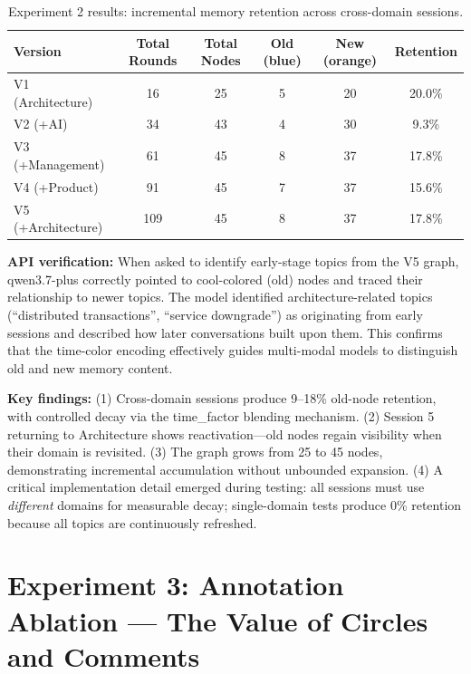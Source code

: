\documentclass[11pt,a4paper]{article}
\begin{document}
\begin{table}[h]
\centering\footnotesize
\caption{Experiment 2 results: incremental memory retention across cross-domain sessions.}
\label{tab:exp2_res}
\begin{tabular}{lccccc}
\toprule
\textbf{Version} & \textbf{Total Rounds} & \textbf{Total Nodes} & \textbf{Old (blue)} & \textbf{New (orange)} & \textbf{Retention} \\
\midrule
V1 (Architecture)     & 16  & 25 & 5  & 20 & 20.0\% \\
V2 (+AI)              & 34  & 43 & 4  & 30 & 9.3\% \\
V3 (+Management)      & 61  & 45 & 8  & 37 & 17.8\% \\
V4 (+Product)         & 91  & 45 & 7  & 37 & 15.6\% \\
V5 (+Architecture)     & 109 & 45 & 8  & 37 & 17.8\% \\
\bottomrule
\end{tabular}
\end{table}

\textbf{API verification:} When asked to identify early-stage topics from the V5 graph, qwen3.7-plus correctly pointed to cool-colored (old) nodes and traced their relationship to newer topics. The model identified architecture-related topics (``distributed transactions'', ``service downgrade'') as originating from early sessions and described how later conversations built upon them. This confirms that the time-color encoding effectively guides multi-modal models to distinguish old and new memory content.

\textbf{Key findings:} (1) Cross-domain sessions produce 9--18\% old-node retention, with controlled decay via the time\_factor blending mechanism. (2) Session 5 returning to Architecture shows reactivation---old nodes regain visibility when their domain is revisited. (3) The graph grows from 25 to 45 nodes, demonstrating incremental accumulation without unbounded expansion. (4) A critical implementation detail emerged during testing: all sessions must use \textit{different} domains for measurable decay; single-domain tests produce 0\% retention because all topics are continuously refreshed.


\section{Experiment 3: Annotation Ablation — The Value of Circles and Comments}
\end{document}
